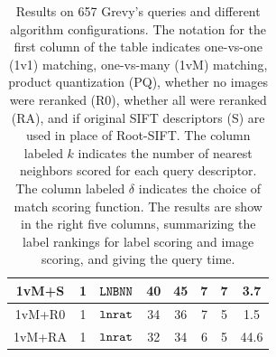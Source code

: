 \begin{table}
{\begin{tabular}{| c c c || c  c | c  c || c |}
1vM+S & 1 & $\tt LNBNN$ & 40 & 45 & 7 & 7 & 3.7\\
\hline
1vM+R0 & 1 & $\tt lnrat$ & 34 & 36 & 7 & 5 & 1.5\\
1vM+RA & 1 & $\tt lnrat$ & 32 & 34 & 6 & 5 & 44.6\\
\hline
\end{tabular}
}
\caption{\footnotesize{Results on 657 Grevy's queries and different algorithm
  configurations.  The notation for the first column of the
  table indicates one-vs-one (1v1) matching, one-vs-many (1vM) matching,
  product quantization (PQ), whether no images were reranked
  (R0), whether all were reranked (RA), and if original SIFT
  descriptors (S) are used in place of Root-SIFT.  The column labeled $k$
  indicates the number of nearest neighbors scored for each query
  descriptor. The column labeled $\delta$ indicates the choice of
  match scoring function.  The results are show in the right five
  columns, summarizing the label rankings for label scoring and image
  scoring, and giving the query time.}}
\label{tab:gz}
\end{table}

\ifxetex
\else

